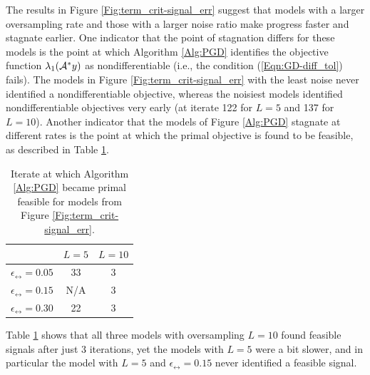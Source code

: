 \begin{enumerate}
The results in Figure \ref{Fig:term_crit-signal_err} suggest that models with a larger oversampling rate and those with a larger noise ratio make progress faster and stagnate earlier.  One indicator that the point of stagnation differs for these models is the point at which Algorithm \ref{Alg:PGD} identifies the objective function $\lambda_1({\mathcal A}^*y)$ as nondifferentiable (i.e., the condition (\ref{Eqn:GD-diff_tol}) fails).  The models in Figure \ref{Fig:term_crit-signal_err} with the least noise never identified a nondifferentiable objective, whereas the noisiest models identified nondifferentiable objectives very early (at iterate 122 for $L=5$ and 137 for $L=10$).  Another indicator that the models of Figure \ref{Alg:PGD} stagnate at different rates is the point at which the primal objective is found to be feasible, as described in Table \ref{Tab:term_crit-pr_feas_faster_for_big_L_noise}.

\begin{table}[H]
\centering
\begin{tabular}{ |c|c|c| }
\hline
&	$L = 5$
	&	$L = 10$	\\
 \hline
$\epsilon_\rel = 0.05$
&     33 &   3 		\\
 \hline
$\epsilon_\rel = 0.15$
&  N/A &  3 	\\
 \hline
$\epsilon_\rel = 0.30$
&  22 &  3	\\
 \hline
\end{tabular}
	\caption{Iterate at which Algorithm \ref{Alg:PGD} became primal feasible for models from Figure \ref{Fig:term_crit-signal_err}.}
	\label{Tab:term_crit-pr_feas_faster_for_big_L_noise}
\end{table}

Table \ref{Tab:term_crit-pr_feas_faster_for_big_L_noise} shows that all three models with oversampling $L = 10$ found feasible signals after just 3 iterations, yet the models with $L = 5$ were a bit slower, and in particular the model with $L = 5$ and $\epsilon_\rel = 0.15$ never identified a feasible signal.



\end{enumerate}
